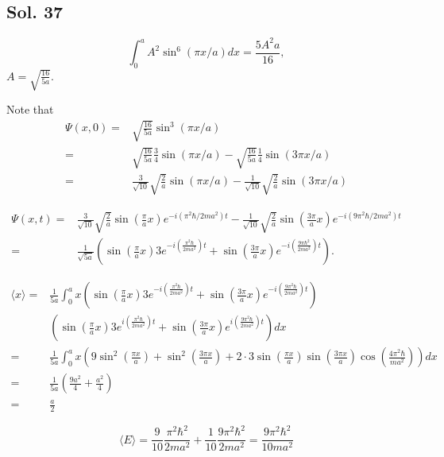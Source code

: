     \subsection*{Sol. 37}


    $$
    \int_0^aA^2\sin^6(\pi x/a)dx = \frac{5A^2a}{16},
    $$
    $A=\sqrt{\frac{16}{5a}}.$

    Note that 
    \begin{align*}
        \Psi(x,0) = &
        \sqrt{\frac{16}{5a}}\sin^3(\pi x/a)\\
        = & \sqrt{\frac{16}{5a}}
        \frac{3}{4}\sin(\pi x/a) - 
        \sqrt{\frac{16}{5a}}
        \frac{1}{4}\sin(3\pi x/a)\\
        =&
        \frac{3}{\sqrt{10}}\sqrt{\frac{2}{a}}
        \sin(\pi x/a)
        -
        \frac{1}{\sqrt{10}}\sqrt{\frac{2}{a}}
        \sin(3\pi x/a)
    \end{align*}

    
    \begin{align*}
        \Psi(x,t)
    =&\frac{3}{\sqrt{10}}
    \sqrt{\frac{2}{a}}
    \sin(\frac{\pi}{a}x)
    e^{-i(\pi^2\hbar/2ma^2)t}
    -
    \frac{1}{\sqrt{10}}
    \sqrt{\frac{2}{a}}
    \sin(\frac{3\pi}{a}x)
    e^{-i(9\pi^2\hbar/2ma^2)t}\\
    =& 
    \frac{1}{\sqrt{5a}}\left(\sin(\frac{\pi}{a}x)
    3e^{-i(\frac{\pi^2\hbar}{2ma^2})t}+
    \sin(\frac{3\pi}{a}x)e^{-i(\frac{9\pi\hbar^2}{2ma^2})t}\right)
    .
    \end{align*}


    \begin{align*}
        \langle x\rangle
        =&
        \frac{1}{5a}
        \int_0^a
        x
        \left(\sin(\frac{\pi}{a}x)
    3e^{-i(\frac{\pi^2\hbar}{2ma^2})t}+
    \sin(\frac{3\pi}{a}x)e^{-i(\frac{9\pi^2\hbar}{2ma^2})t}\right)\\
    &
        \left(\sin(\frac{\pi}{a}x)
    3e^{i(\frac{\pi^2\hbar}{2ma^2})t}+
    \sin(\frac{3\pi}{a}x)e^{i(\frac{9\pi^2\hbar}{2ma^2})t}\right)dx\\
    =&\frac{1}{5a}
    \int_0^a
    x(9\sin^2(\frac{\pi x}{a})+\sin^2(\frac{3\pi x}{a})+
    2\cdot3\sin(\frac{\pi x}{a})\sin(\frac{3\pi x}{a})
    \cos(\frac{4\pi^2\hbar}{ma^2}))dx\\
    =& \frac{1}{5a}
    (\frac{9a^2}{4}+\frac{a^2}{4})\\
    =& \frac{a}{2}
    \end{align*}

    $$
    \langle E\rangle
    =\frac{9}{10}
    \frac{\pi^2\hbar^2}{2ma^2} + 
    \frac{1}{10}
    \frac{9\pi^2\hbar^2}{2ma^2}
    =
    \frac{9\pi^2\hbar^2}{10ma^2}
    $$

